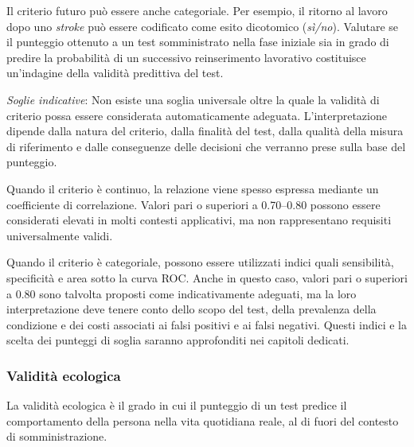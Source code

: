 \documentclass[
  italian,
  letterpaper,
  paper=A4,
  headinclude=on,
  footinclude=on,
  12pt]{scrbook}
\begin{document}
Il criterio futuro può essere anche categoriale. Per esempio, il ritorno
al lavoro dopo uno \emph{stroke} può essere codificato come esito
dicotomico (\emph{sì/no}). Valutare se il punteggio ottenuto a un test
somministrato nella fase iniziale sia in grado di predire la probabilità
di un successivo reinserimento lavorativo costituisce un'indagine della
validità predittiva del test.

\emph{Soglie indicative}: Non esiste una soglia universale oltre la
quale la validità di criterio possa essere considerata automaticamente
adeguata. L'interpretazione dipende dalla natura del criterio, dalla
finalità del test, dalla qualità della misura di riferimento e dalle
conseguenze delle decisioni che verranno prese sulla base del punteggio.

Quando il criterio è continuo, la relazione viene spesso espressa
mediante un coefficiente di correlazione. Valori pari o superiori a
0.70--0.80 possono essere considerati elevati in molti contesti
applicativi, ma non rappresentano requisiti universalmente validi.

Quando il criterio è categoriale, possono essere utilizzati indici quali
sensibilità, specificità e area sotto la curva ROC. Anche in questo
caso, valori pari o superiori a 0.80 sono talvolta proposti come
indicativamente adeguati, ma la loro interpretazione deve tenere conto
dello scopo del test, della prevalenza della condizione e dei costi
associati ai falsi positivi e ai falsi negativi. Questi indici e la
scelta dei punteggi di soglia saranno approfonditi nei capitoli
dedicati.

\subsubsection{Validità ecologica}\label{validituxe0-ecologica}

\begin{tcolorbox}[enhanced jigsaw, left=2mm, colbacktitle=quarto-callout-note-color!10!white, bottomrule=.15mm, opacityback=0, coltitle=black, colframe=quarto-callout-note-color-frame, opacitybacktitle=0.6, leftrule=.75mm, colback=white, toprule=.15mm, title=\textcolor{quarto-callout-note-color}{\faInfo}\hspace{0.5em}{Definizione}, titlerule=0mm, arc=.35mm, breakable, rightrule=.15mm, bottomtitle=1mm, toptitle=1mm]

La validità ecologica è il grado in cui il punteggio di un test predice
il comportamento della persona nella vita quotidiana reale, al di fuori
del contesto di somministrazione.

\end{tcolorbox}
\end{document}

